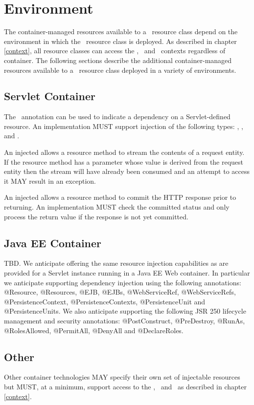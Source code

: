 \chapter{Environment}

The container-managed resources available to a \jaxrs\ resource class depend on the environment in which the \jaxrs\ resource class is deployed. As described in chapter \ref{context}, all resource classes can access the \UriInfo, \HttpHeaders\ and \Request\ contexts regardless of container. The following sections describe the additional container-managed resources available to a \jaxrs\ resource class deployed in a variety of environments.

\section{Servlet Container}

The \Resource\ annotation can be used to indicate a dependency on a Servlet-defined resource. An implementation MUST support injection of the following types: , ,  and .

An injected  allows a resource method to stream the contents of a request entity. If the resource method has a parameter whose value is derived from the request entity then the stream will have already been consumed and an attempt to access it MAY result in an exception.

An injected  allows a resource method to commit the HTTP response prior to returning. An implementation MUST check the committed status and only process the return value if the response is not yet committed.

\section{Java EE Container}

\begin{ednote*}
TBD. We anticipate offering the same resource injection capabilities as are provided for a Servlet instance running in a Java EE Web container. In particular we anticipate supporting dependency injection using the following annotations: @Resource, @Resources, @EJB, @EJBs, @WebServiceRef, @WebServiceRefs, @PersistenceContext, @PersistenceContexts, @PersistenceUnit and @PersistenceUnits. We also anticipate supporting the following JSR 250 lifecycle management and security annotations:  @PostConstruct, @PreDestroy, @RunAs, @RolesAllowed, @PermitAll, @DenyAll and @DeclareRoles.
\end{ednote*}

\section{Other}

Other container technologies MAY specify their own set of injectable resources but MUST, at a minimum, support access to the \UriInfo, \HttpHeaders\ and \Request\ as described in chapter \ref{context}.